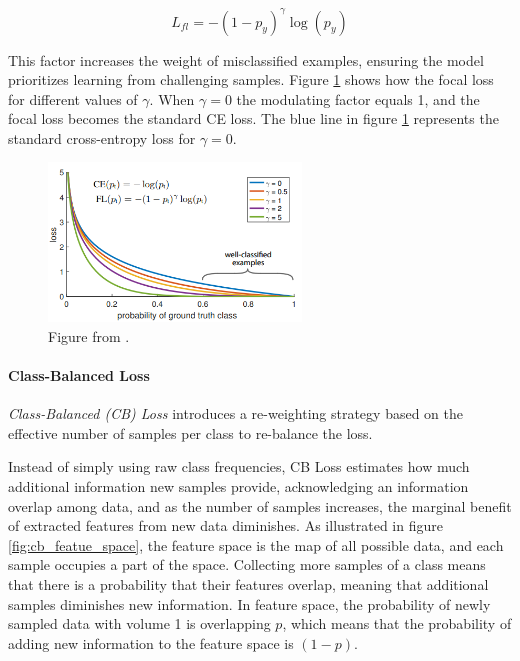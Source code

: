 \begin{equation}
    \label{eq:focal_loss}
    L_{fl} = -(1 - p_y)^\gamma \log(p_y)
\end{equation}

This factor increases the weight of misclassified examples, ensuring the model prioritizes learning from challenging samples. Figure \ref{fig:focal_loss} shows how the focal loss for different values of $\gamma$. When $\gamma = 0$ the modulating factor equals 1, and the focal loss becomes the standard CE loss. The blue line in figure \ref{fig:focal_loss} represents the standard cross-entropy loss for $\gamma = 0$.

\begin{figure}[h!]
    \centering
    \includegraphics[width=0.6\textwidth]{Images/focal_loss.png}
    \caption{Figure from \cite{lin2018focallossdenseobject}. }
    \label{fig:focal_loss}
\end{figure}

\paragraph{Class-Balanced Loss}
\emph{Class-Balanced (CB) Loss} \cite{cui2019classbalancedlossbasedeffective} introduces a re-weighting strategy based on the effective number of samples per class to re-balance the loss.

Instead of simply using raw class frequencies, CB Loss estimates how much additional information new samples provide, acknowledging an information overlap among data, and as the number of samples increases, the marginal benefit of extracted features from new data diminishes. As illustrated in figure \ref{fig:cb_featue_space}, the feature space is the map of all possible data, and each sample occupies a part of the space. Collecting more samples of a class means that there is a probability that their features overlap, meaning that additional samples diminishes new information.
In feature space, the probability of newly sampled data with volume 1 is overlapping $p$, which means that the probability of adding new information to the feature space is $(1-p)$. 


